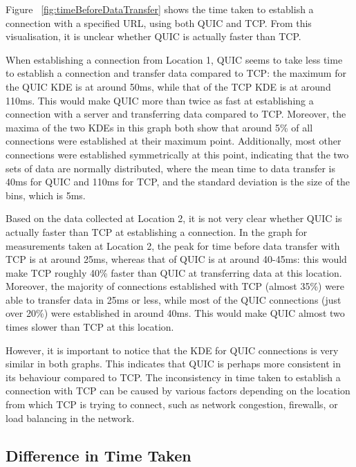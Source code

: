 \documentclass{l4proj}
\begin{document}
Figure ~\ref{fig:timeBeforeDataTransfer} shows the time taken to establish a connection with a specified URL, using both QUIC and TCP. From this visualisation, it is unclear whether QUIC is actually faster than TCP. 

When establishing a connection from Location 1, QUIC seems to take less time to establish a connection and transfer data compared to TCP: the maximum for the QUIC KDE is at around 50ms, while that of the TCP KDE is at around 110ms. This would make QUIC more than twice as fast at establishing a connection with a server and transferring data compared to TCP. 
Moreover, the maxima of the two KDEs in this graph both show that around 5\% of all connections were established at their maximum point. Additionally, most other connections were established symmetrically at this point, indicating that the two sets of data are normally distributed, where the mean time to data transfer is 40ms for QUIC and 110ms for TCP, and the standard deviation is the size of the bins, which is 5ms.

Based on the data collected at Location 2, it is not very clear whether QUIC is actually faster than TCP at establishing a connection. In the graph for measurements taken at Location 2, the peak for time before data transfer with TCP is at around 25ms, whereas that of QUIC is at around 40-45ms: this would make TCP roughly 40\% faster than QUIC at transferring data at this location. Moreover, the majority of connections established with TCP (almost 35\%) were able to transfer data in 25ms or less, while most of the QUIC connections (just over 20\%) were established in around 40ms. This would make QUIC almost two times slower than TCP at this location.

However, it is important to notice that the KDE for QUIC connections is very similar in both graphs. This indicates that QUIC is perhaps more consistent in its behaviour compared to TCP. The inconsistency in time taken to establish a connection with TCP can be caused by various factors depending on the location from which TCP is trying to connect, such as network congestion, firewalls, or load balancing in the network.

\subsection{Difference in Time Taken}
\end{document}
